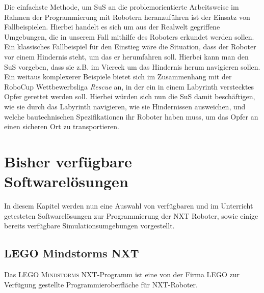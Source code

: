 \documentclass[paper=a4, DIV=calc, BCOR=15mm, twoside=on, onecolumn=on, open = right, titlepage =on, parskip =half, headsepline = on, footsepline = on, chapterprefix = off, appendixprefix = off, fontsize = 12pt, numbers = noenddot, abstract = on]{scrbook}
\begin{document}
Die einfachste Methode, um SuS an die problemorientierte Arbeitsweise im Rahmen der Programmierung mit Robotern heranzuführen ist der Einsatz von Fallbeispielen. Hierbei handelt es sich um aus der Realwelt gegriffene Umgebungen, die in unserem Fall mithilfe des Roboters erkundet werden sollen. Ein klassisches Fallbeispiel für den Einstieg wäre die Situation, dass der Roboter vor einem Hindernis steht, um das er herumfahren soll. Hierbei kann man den SuS vorgeben, dass sie z.B. im Viereck um das Hindernis herum navigieren sollen.\\
Ein weitaus komplexerer Beispiele bietet sich im Zusammenhang mit der RoboCup Wettbewerbsliga \emph{Rescue} an, in der ein in einem Labyrinth verstecktes Opfer gerettet werden soll. Hierbei würden sich nun die SuS damit beschäftigen, wie sie durch das Labyrinth navigieren, wie sie Hindernissen ausweichen, und welche bautechnischen Spezifikationen ihr Roboter haben muss, um das Opfer an einen sicheren Ort zu transportieren.

\chapter{Bisher verfügbare Softwarelösungen}
\label{sec:software bisher}
In diesem Kapitel werden nun eine Auswahl von verfügbaren und im Unterricht getesteten Softwarelösungen zur Programmierung der NXT Roboter, sowie einige bereits verfügbare Simulationsumgebungen vorgestellt. 

\section{LEGO Mindstorms NXT}
\label{sec:LMNXT}

Das \textsc{LEGO Mindstorms} NXT-Programm ist eine von der Firma \textsc{LEGO} zur Verfügung gestellte Programmieroberfläche für NXT-Roboter.
\end{document}
